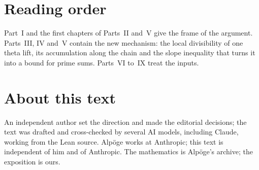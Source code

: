 \section*{Reading order}

Part~I and the first chapters of Parts~II and~V give the frame of the argument. Parts~III, IV and~V contain the new mechanism: the local divisibility of one theta lift, its accumulation along the chain and the slope inequality that turns it into a bound for prime sums. Parts~VI to~IX treat the inputs.

\section*{About this text}

An independent author set the direction and made the editorial decisions; the text was drafted and cross-checked by several AI models, including Claude, working from the Lean source. Alpöge works at Anthropic; this text is independent of him and of Anthropic. The mathematics is Alpöge's archive; the exposition is ours.
